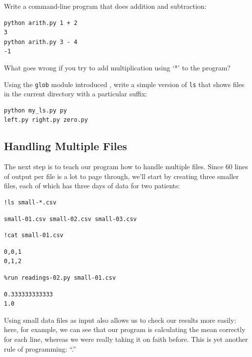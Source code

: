 \documentclass{book}
\begin{document}
\begin{challenge}
  Write a command-line program that does addition and subtraction:
\begin{verbatim}
python arith.py 1 + 2
3
python arith.py 3 - 4
-1
\end{verbatim}
  What goes wrong if you try to add multiplication using `*' to the
  program?
\end{challenge}

\begin{challenge}
  Using the \texttt{glob} module introduced
  , write a simple version of \texttt{ls}
  that shows files in the current directory with a particular suffix:
\begin{verbatim}
python my_ls.py py
left.py right.py zero.py
\end{verbatim}
\end{challenge}

\subsection{Handling Multiple Files}

The next step is to teach our program how to handle multiple files.
Since 60 lines of output per file is a lot to page through, we'll start
by creating three smaller files, each of which has three days of data
for two patients:

\begin{verbatim}
!ls small-*.csv
\end{verbatim}

\begin{verbatim}
small-01.csv small-02.csv small-03.csv
\end{verbatim}

\begin{verbatim}
!cat small-01.csv
\end{verbatim}

\begin{verbatim}
0,0,1
0,1,2
\end{verbatim}

\begin{verbatim}
%run readings-02.py small-01.csv
\end{verbatim}

\begin{verbatim}
0.333333333333
1.0
\end{verbatim}

Using small data files as input also allows us to check our results more
easily: here, for example, we can see that our program is calculating
the mean correctly for each line, whereas we were really taking it on
faith before. This is yet another rule of programming:
``.''
\end{document}
